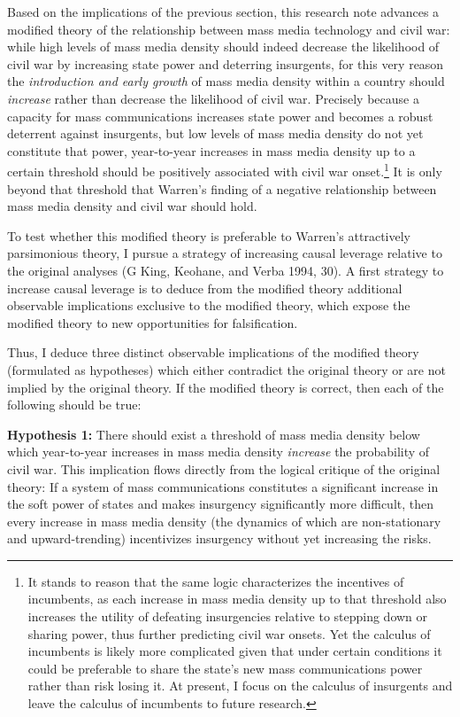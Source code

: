 \documentclass[11pt,article,oneside]{memoir}
\begin{document}
Based on the implications of the previous section, this research note
advances a modified theory of the relationship between mass media
technology and civil war: while high levels of mass media density should
indeed decrease the likelihood of civil war by increasing state power
and deterring insurgents, for this very reason the \emph{introduction
and early growth} of mass media density within a country should
\emph{increase} rather than decrease the likelihood of civil war.
Precisely because a capacity for mass communications increases state
power and becomes a robust deterrent against insurgents, but low levels
of mass media density do not yet constitute that power, year-to-year
increases in mass media density up to a certain threshold should be
positively associated with civil war onset.\footnote{It stands to reason
  that the same logic characterizes the incentives of incumbents, as
  each increase in mass media density up to that threshold also
  increases the utility of defeating insurgencies relative to stepping
  down or sharing power, thus further predicting civil war onsets. Yet
  the calculus of incumbents is likely more complicated given that under
  certain conditions it could be preferable to share the state's new
  mass communications power rather than risk losing it. At present, I
  focus on the calculus of insurgents and leave the calculus of
  incumbents to future research.} It is only beyond that threshold that
Warren's finding of a negative relationship between mass media density
and civil war should hold.

To test whether this modified theory is preferable to Warren's
attractively parsimonious theory, I pursue a strategy of increasing
causal leverage relative to the original analyses (G King, Keohane, and
Verba 1994, 30). A first strategy to increase causal leverage is to
deduce from the modified theory additional observable implications
exclusive to the modified theory, which expose the modified theory to
new opportunities for falsification.

Thus, I deduce three distinct observable implications of the modified
theory (formulated as hypotheses) which either contradict the original
theory or are not implied by the original theory. If the modified theory
is correct, then each of the following should be true:

\textbf{Hypothesis 1:} There should exist a threshold of mass media
density below which year-to-year increases in mass media density
\emph{increase} the probability of civil war. This implication flows
directly from the logical critique of the original theory: If a system
of mass communications constitutes a significant increase in the soft
power of states and makes insurgency significantly more difficult, then
every increase in mass media density (the dynamics of which are
non-stationary and upward-trending) incentivizes insurgency without yet
increasing the risks.
\end{document}

